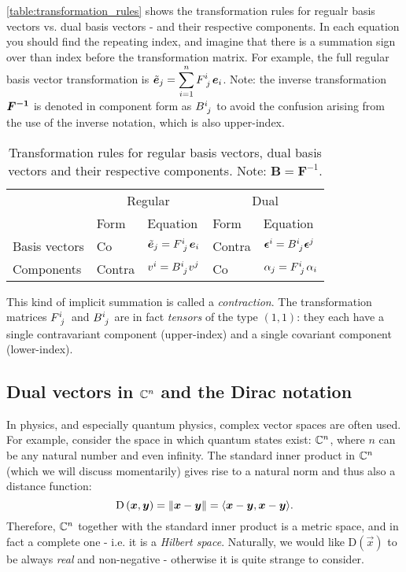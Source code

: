 \autoref{table:transformation_rules} shows the transformation rules for regualr basis vectors vs. dual basis vectors - and their respective components. In each equation you should find the repeating index, and imagine that there is a summation sign over than index before the transformation matrix. For example, the full regular basis vector transformation is $\ebc{j}=\displaystyle\sum_{i=1}^{n}\Forwcomps\eb{i}$. Note: the inverse transformation $\Backw$ is denoted in component form as $\Backwcomps$ to avoid the confusion arising from the use of the inverse notation, which is also upper-index.

\begin{table}
    \caption{Transformation rules for regular basis vectors, dual basis vectors and their respective components. Note: $\bm{B}=\bm{F}^{-1}$.}\label{table:transformation_rules}
    \begin{center}
        \begin{tabular}[c]{l|ll|ll}
            \toprule
              & \multicolumn{2}{c|}{Regular} & \multicolumn{2}{c}{Dual} \\
              & Form & Equation & Form & Equation \\
            \midrule
            Basis vectors & Co & $\ebc{j}=\Forwcomps\eb{i}$ & Contra & $\dualeb{i}=\Backwcomps\dualeb{j}$ \\
            Components & Contra & $v^{i}=\Backwcomps v^{j}$ & Co  & $\alpha_{j}=\Forwcomps \alpha_{i}$ \\
            \bottomrule
        \end{tabular}
    \end{center}
\end{table}
This kind of implicit summation is called a \textit{contraction}. The transformation matrices $\Forwcomps$ and $\Backwcomps$ are in fact \textit{tensors} of the type $(1,1)$: they each have a single contravariant component (upper-index) and a single covariant component (lower-index).

\subsection{Dual vectors in $\Cs[n]$ and the Dirac notation}
In physics, and especially quantum physics, complex vector spaces are often used. For example, consider the space in which quantum states exist: $\Cs[n]$, where $n$ can be any natural number and even infinity. The standard inner product in $\Cs[n]$ (which we will discuss momentarily) gives rise to a natural norm and thus also a distance function:
\begin{equation}
    \text{D}\left(\vec{x},\vec{y}\right) = \norm{\vec{x}-\vec{y}} = \inner{\vec{x}-\vec{y}}{\vec{x}-\vec{y}}.
    \label{eq:distance_Cn}
\end{equation}
Therefore, $\Cs[n]$ together with the standard inner product is a metric space, and in fact a complete one - i.e. it is a \textit{Hilbert space}. Naturally, we would like $\text{D}\left(\vec{x}\right)$ to be always \textit{real} and non-negative - otherwise it is quite strange to consider.

